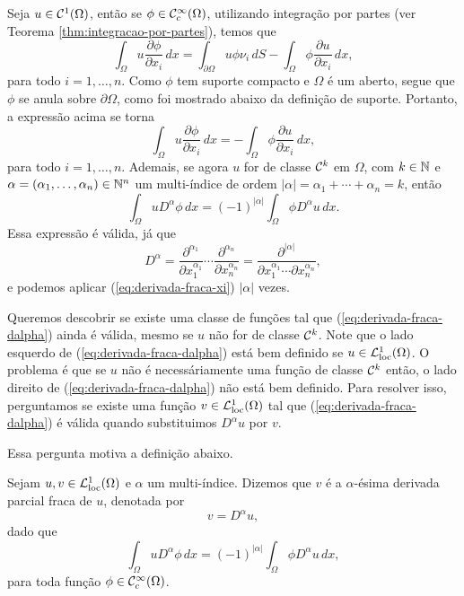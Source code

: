 Seja $u \in \mathcal{C}^1(\Omega)$, então se $\phi \in \mathcal{C}^\infty_c(\Omega)$, utilizando integração por partes (ver Teorema \ref{thm:integracao-por-partes}), temos que
\[
    \int_\Omega u \dfrac{\partial \phi}{\partial x_i} \,dx = \int_{\partial\Omega} u\phi \nu_i \, dS- \int_\Omega \phi \dfrac{\partial u}{\partial x_i} \,dx,
\]
para todo $i = 1,\dots,n$. Como $\phi$ tem suporte compacto e $\Omega$ é um aberto, segue que $\phi$ se anula sobre $\partial\Omega$, como foi mostrado abaixo da definição de suporte. Portanto, a expressão acima se torna
\begin{equation} \label{eq:derivada-fraca-xi}
    \int_\Omega u \dfrac{\partial \phi}{\partial x_i} \,dx = - \int_\Omega \phi \dfrac{\partial u}{\partial x_i} \,dx,
\end{equation}
para todo $i = 1,\dots,n$.
Ademais, se agora $u$ for de classe $\mathcal{C}^k$ em $\Omega$, com $k \in \mathbb{N}$ e $\alpha = (\alpha_1,\dots,\alpha_n) \in \mathbb{N}^n$ um multi-índice de ordem $|\alpha| = \alpha_1 + \cdots + \alpha_n = k$, então
\begin{equation} \label{eq:derivada-fraca-dalpha}
    \int_\Omega u D^\alpha \phi \,dx = (-1)^{|\alpha|} \int_\Omega \phi D^\alpha u \,dx.
\end{equation}
Essa expressão é válida, já que
\[
    D^\alpha = \dfrac{\partial^{\alpha_1} }{\partial x_1^{\alpha_1}} \cdots \dfrac{\partial^{\alpha_n} }{\partial x_n^{\alpha_n}} = \dfrac{\partial^{|\alpha|} }{\partial x_1^{\alpha_1} \cdots \partial x_n^{\alpha_n}},
\]
e podemos aplicar (\ref{eq:derivada-fraca-xi}) $|\alpha|$ vezes.

Queremos descobrir se existe uma classe de funções tal que (\ref{eq:derivada-fraca-dalpha}) ainda é válida, mesmo se $u$ não for de classe $\mathcal{C} ^k$. Note que o lado esquerdo de (\ref{eq:derivada-fraca-dalpha}) está bem definido se $u \in \mathcal{L}^1_{\mathrm{loc}}(\Omega)$.
O problema é que se $u$ não é necessáriamente uma função de classe $\mathcal{C}^k$ então, o lado direito de (\ref{eq:derivada-fraca-dalpha}) não está bem definido. Para resolver isso, perguntamos se existe uma função $v \in \mathcal{L}^1_{\mathrm{loc}}(\Omega)$ tal que (\ref{eq:derivada-fraca-dalpha}) é válida quando substituimos $D^\alpha u$ por $v$.

Essa pergunta motiva a definição abaixo.

\begin{dbox}
    Sejam $u,v \in \mathcal{L}^1_{\mathrm{loc}}(\Omega)$ e $\alpha$ um multi-índice. Dizemos que $v$ é a $\alpha$-ésima derivada parcial fraca de $u$, denotada por
    \[
        v = D^\alpha u,
    \]
    dado que
    \begin{equation} \label{eq:derivada-fraca}
        \int_\Omega u D^\alpha \phi \,dx = (-1)^{|\alpha|} \int_\Omega \phi D^\alpha u\,dx,
    \end{equation}
    para toda função $\phi \in \mathcal{C} ^\infty_c(\Omega)$.
\end{dbox}

